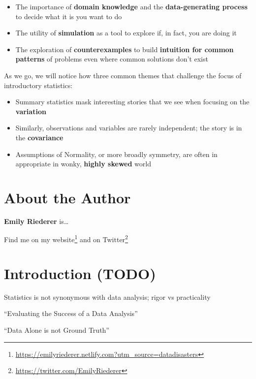 \documentclass[
]{krantz}
\providecommand{\tightlist}{%
  \setlength{\itemsep}{0pt}\setlength{\parskip}{0pt}}
\renewcommand{\href}[2]{#2\footnote{\url{#1}}}
\begin{document}
\begin{itemize}
\tightlist
\item
  The importance of \textbf{domain knowledge} and the \textbf{data-generating process} to decide what it is you want to do
\item
  The utility of \textbf{simulation} as a tool to explore if, in fact, you are doing it
\item
  The exploration of \textbf{counterexamples} to build \textbf{intuition for common patterns} of problems even where common solutions don't exist
\end{itemize}

As we go, we will notice how three common themes that challenge the focus of introductory statistics:

\begin{itemize}
\tightlist
\item
  Summary statistics mask interesting stories that we see when focusing on the \textbf{variation}
\item
  Similarly, observations and variables are rarely independent; the story is in the \textbf{covariance}
\item
  Assumptions of Normality, or more broadly symmetry, are often in appropriate in wonky, \textbf{highly skewed} world
\end{itemize}

\hypertarget{about-the-author}{%
\chapter*{About the Author}\label{about-the-author}}


\textbf{Emily Riederer} is\ldots{}

Find me on my \href{https://emilyriederer.netlify.com?utm_source=datadisasters}{website} and on \href{https://twitter.com/EmilyRiederer}{Twitter}

\mainmatter

\hypertarget{introduction-todo}{%
\chapter{Introduction (TODO)}\label{introduction-todo}}

Statistics is not synonymous with data analysis; rigor vs practicality

``Evaluating the Success of a Data Analysis'' \citep{hicks2019evaluating}

``Data Alone is not Ground Truth'' \citep{bassa_2017}
\end{document}
